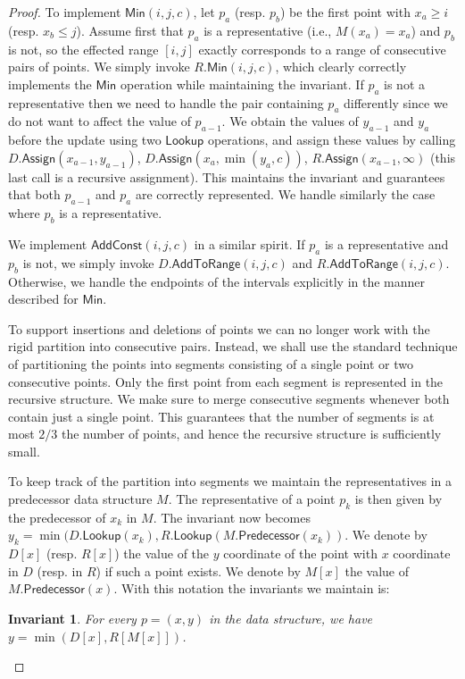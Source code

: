 \documentclass[10pt,a4paper]{article}
\newcommand{\AtR}{\mathsf{AddToRange}}
\newcommand{\AssignOp}{\mathsf{Assign}}
\newcommand{\Lookup}{\mathsf{Lookup}}
\newcommand{\Predecessor}{\mathsf{Predecessor}}
\newcommand{\Add}{\mathsf{AddConst}}
\newcommand{\Min}{\mathsf{Min}}
\newtheorem{invariant}{Invariant}
\begin{document}
\begin{proof}
To implement $\Min(i,j,c)$, let $p_a$ (resp. $p_b$) be the first point with $x_a \geq i$ (resp. $x_b \leq j$).  Assume first that $p_a$ is a representative (i.e., $M(x_a) = x_a$) and $p_b$ is not, so the effected range $[i,j]$ exactly corresponds to a range of consecutive pairs of points. We simply invoke $R.\Min(i,j,c)$, which clearly correctly implements the $\Min$ operation while maintaining the invariant. 
If $p_a$ is not a representative then we need to handle the pair containing $p_a$ differently since we do not want to affect the value of $p_{a-1}$. We obtain the values of $y_{a-1}$ and $y_a$ before the update using two $\Lookup$ operations, and assign these values by calling $D.\AssignOp(x_{a-1},y_{a-1})$, $D.\AssignOp(x_a,\min(y_a,c))$,  $R.\AssignOp(x_{a-1},\infty)$ (this last call is a recursive assignment). This maintains the invariant and guarantees that both $p_{a-1}$ and $p_a$ are correctly represented. We handle similarly the case where $p_b$ is a representative.

We implement $\Add(i,j,c)$ in a similar spirit. If $p_a$ is a representative and $p_b$ is not, we simply invoke $D.\AtR(i,j,c)$ and $R.\AtR(i,j,c)$. Otherwise, we handle the endpoints of the intervals explicitly in the manner described for $\Min$. 

To support insertions and deletions of points we can no longer work with the rigid partition into consecutive pairs. Instead, we shall use the standard technique of partitioning the points into segments consisting of a single point or two consecutive points. Only the first point from each segment is represented in the recursive structure. 
We make sure to merge consecutive segments whenever both contain just a single point. This guarantees that the number of segments is at most $2/3$ the number of points, and hence the recursive structure is sufficiently small. 

To keep track of the partition into segments we maintain the representatives in a predecessor data structure $M$. The representative of a point $p_k$ is then given by the predecessor of $x_k$ in $M$. The invariant now becomes $y_k = \min(D.\Lookup(x_k), R.\Lookup(M.\Predecessor(x_k))$.
We denote by $D[x]$ (resp. $R[x]$) the value of the $y$ coordinate of the point with $x$ coordinate in $D$ (resp. in $R$) if such a point exists. We denote by $M[x]$ the value of $M.\Predecessor(x)$.
With this notation the invariants we maintain is:
\begin{invariant}\label{inv:addminvalue}
For every $p = (x,y)$ in the data structure, we have  $y = \min(D[x],R[M[x]])$.
\end{invariant}


\end{proof}
\end{document}
